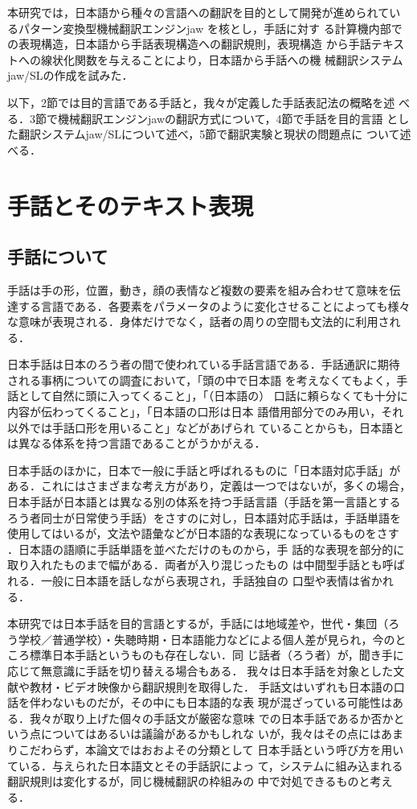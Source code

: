 \documentclass[japanese]{jnlp_1.4}
\begin{document}
本研究では，日本語から種々の言語への翻訳を目的として開発が進められてい
るパターン変換型機械翻訳エンジンjaw \cite{Shie2004}を核とし，手話に対す
る計算機内部での表現構造，日本語から手話表現構造への翻訳規則，表現構造
から手話テキストへの線状化関数を与えることにより，日本語から手話への機
械翻訳システムjaw/SLの作成を試みた．

以下，2節では目的言語である手話と，我々が定義した手話表記法の概略を述
べる．3節で機械翻訳エンジンjawの翻訳方式について，4節で手話を目的言語
とした翻訳システムjaw/SLについて述べ，5節で翻訳実験と現状の問題点に
ついて述べる．

\section{手話とそのテキスト表現}


\subsection{手話について}
\label{sec:JSL}

手話は手の形，位置，動き，顔の表情など複数の要素を組み合わせて意味を伝
達する言語である．各要素をパラメータのように変化させることによっても様々
な意味が表現される．身体だけでなく，話者の周りの空間も文法的に利用され
る．

日本手話は日本のろう者の間で使われている手話言語である．手話通訳に期待
される事柄についての調査\cite{Shirasawa2002}において，「頭の中で日本語
を考えなくてもよく，手話として自然に頭に入ってくること」，「（日本語の）
口話に頼らなくても十分に内容が伝わってくること」，「日本語の口形は日本
語借用部分でのみ用い，それ以外では手話口形を用いること」などがあげられ
ていることからも，日本語とは異なる体系を持つ言語であることがうかがえる．

日本手話のほかに，日本で一般に手話と呼ばれるものに「日本語対応手話」が
ある．これにはさまざまな考え方があり，定義は一つではないが，多くの場合，
日本手話が日本語とは異なる別の体系を持つ手話言語（手話を第一言語とする
ろう者同士が日常使う手話）をさすのに対し，日本語対応手話は，手話単語を
使用してはいるが，文法や語彙などが日本語的な表現になっているものをさす
\cite{Yonekawa2004}．日本語の語順に手話単語を並べただけのものから，手
話的な表現を部分的に取り入れたものまで幅がある．両者が入り混じったもの
は中間型手話とも呼ばれる．一般に日本語を話しながら表現され，手話独自の
口型や表情は省かれる．


本研究では日本手話を目的言語とするが，手話には地域差や，世代・集団（ろ
う学校／普通学校）・失聴時期・日本語能力などによる個人差が見られ，今のと
ころ標準日本手話というものも存在しない\cite{Nakamura2002,Inaba1998}．同
じ話者（ろう者）が，聞き手に応じて無意識に手話を切り替える場合もある．
我々は日本手話を対象とした文献や教材・ビデオ映像から翻訳規則を取得した．
手話文はいずれも日本語の口話を伴わないものだが，その中にも日本語的な表
現が混ざっている可能性はある．我々が取り上げた個々の手話文が厳密な意味
での日本手話であるか否かという点についてはあるいは議論があるかもしれな
いが，我々はその点にはあまりこだわらず，本論文ではおおよその分類として
日本手話という呼び方を用いている．与えられた日本語文とその手話訳によっ
て，システムに組み込まれる翻訳規則は変化するが，同じ機械翻訳の枠組みの
中で対処できるものと考える．
\end{document}
